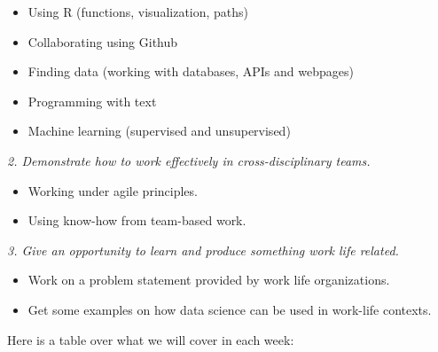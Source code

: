 \documentclass[
]{article}
\providecommand{\tightlist}{%
  \setlength{\itemsep}{0pt}\setlength{\parskip}{0pt}}
\begin{document}
\begin{itemize}
\tightlist
\item
  Using R (functions, visualization, paths)
\item
  Collaborating using Github
\item
  Finding data (working with databases, APIs and webpages)
\item
  Programming with text
\item
  Machine learning (supervised and unsupervised)
\end{itemize}

\emph{2. Demonstrate how to work effectively in cross-disciplinary
teams.}

\begin{itemize}
\tightlist
\item
  Working under agile principles.
\item
  Using know-how from team-based work.
\end{itemize}

\emph{3. Give an opportunity to learn and produce something work life
related.}

\begin{itemize}
\tightlist
\item
  Work on a problem statement provided by work life organizations.
\item
  Get some examples on how data science can be used in work-life
  contexts.
\end{itemize}

Here is a table over what we will cover in each week:
\end{document}
